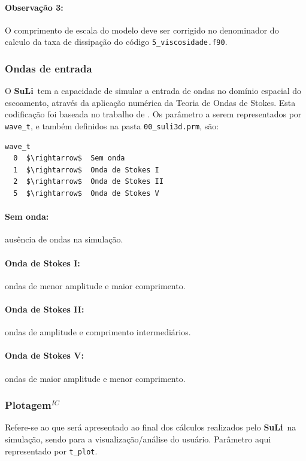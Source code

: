 \documentclass[12pt, a4paper]{article}
\newcommand{\SL}{{\bf SuLi}}
\begin{document}
\paragraph{Observação 3:} O comprimento de escala do modelo deve ser corrigido no denominador do calculo da taxa de dissipação do código \verb|5_viscosidade.f90|.

\subsubsection{Ondas de entrada}
O \SL\ tem a capacidade de simular a entrada de ondas no domínio espacial do escoamento, através da aplicação numérica da Teoria de Ondas de Stokes. Esta codificação foi baseada no trabalho de \cite{higuera2013}. Os parâmetro a serem representados por \verb|wave_t|, e também definidos na pasta \verb|00_suli3d.prm|, são:

\begin{lstlisting}[escapeinside='']
wave_t	
  0  $\rightarrow$  Sem onda
  1  $\rightarrow$  Onda de Stokes I
  2  $\rightarrow$  Onda de Stokes II
  5  $\rightarrow$  Onda de Stokes V
\end{lstlisting}

\paragraph{Sem onda:} ausência de ondas na simulação.
\paragraph{Onda de Stokes I:} ondas de menor amplitude e maior comprimento.
\paragraph{Onda de Stokes II:} ondas de amplitude e comprimento intermediários.
\paragraph{Onda de Stokes V:} ondas de maior amplitude e menor comprimento.

\subsubsection{Plotagem$^{IC}$}
Refere-se ao que será apresentado ao final dos cálculos realizados pelo \SL\ na simulação, sendo para a visualização/análise do usuário. Parâmetro aqui representado por \verb|t_plot|.
\end{document}
